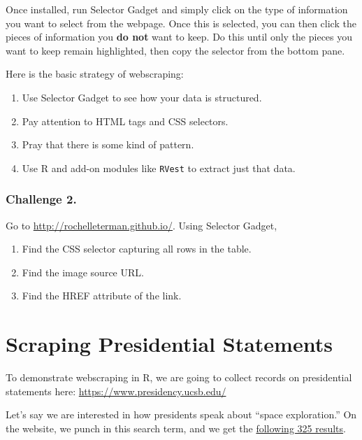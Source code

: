 \documentclass[]{book}
\providecommand{\tightlist}{%
  \setlength{\itemsep}{0pt}\setlength{\parskip}{0pt}}
\begin{document}
Once installed, run Selector Gadget and simply click on the type of
information you want to select from the webpage. Once this is selected,
you can then click the pieces of information you \textbf{do not} want to
keep. Do this until only the pieces you want to keep remain highlighted,
then copy the selector from the bottom pane.

Here is the basic strategy of webscraping:

\begin{enumerate}
\def\labelenumi{\arabic{enumi}.}
\tightlist
\item
  Use Selector Gadget to see how your data is structured.
\item
  Pay attention to HTML tags and CSS selectors.
\item
  Pray that there is some kind of pattern.
\item
  Use R and add-on modules like \texttt{RVest} to extract just that
  data.
\end{enumerate}

\subsubsection*{Challenge 2.}\label{challenge-2.-14}

Go to \url{http://rochelleterman.github.io/}. Using Selector Gadget,

\begin{enumerate}
\def\labelenumi{\arabic{enumi}.}
\tightlist
\item
  Find the CSS selector capturing all rows in the table.
\item
  Find the image source URL.
\item
  Find the HREF attribute of the link.
\end{enumerate}

\section{Scraping Presidential
Statements}\label{scraping-presidential-statements}

To demonstrate webscraping in R, we are going to collect records on
presidential statements here: \url{https://www.presidency.ucsb.edu/}

Let's say we are interested in how presidents speak about ``space
exploration.'' On the website, we punch in this search term, and we get
the
\href{https://www.presidency.ucsb.edu/advanced-search?field-keywords=\%22space+exploration\%22\&field-keywords2=\&field-keywords3=\&from\%5Bdate\%5D=\&to\%5Bdate\%5D=\&person2=\&items_per_page=100}{following
325 results}.
\end{document}
